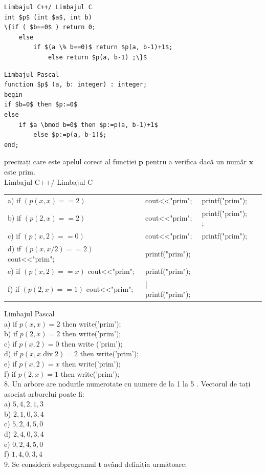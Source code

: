 \documentclass[10pt]{article}
\begin{document}
\begin{verbatim}
Limbajul C++/ Limbajul C
int $p$ (int $a$, int b)
\{if ( $b==0$ ) return 0;
    else
        if $(a \% b==0)$ return $p(a, b-1)+1$;
            else return $p(a, b-1) ;\}$
\end{verbatim}

\begin{verbatim}
Limbajul Pascal
function $p$ (a, b: integer) : integer;
begin
if $b=0$ then $p:=0$
else
    if $a \bmod b=0$ then $p:=p(a, b-1)+1$
        else $p:=p(a, b-1)$;
end;
\end{verbatim}

precizați care este apelul corect al funcției $\mathbf{p}$ pentru a verifica dacă un număr $\mathbf{x}$ este prim.\\
Limbajul C++/ Limbajul C

\begin{center}
\begin{tabular}{llll}
a) if $(p(x, x)==2)$ & cout<<"prim"; & printf("prim"); \\
b) if $(p(2, x)==2)$ & cout<<"prim"; & printf("prim"); ; \\
c) if $(p(x, 2)==0)$ & cout<<"prim"; & printf("prim"); \\
d) if $(p(x, x / 2)==2)$ cout<<"prim"; & printf("prim"); &  \\
e) if $(p(x, 2)==x)$ cout<<"prim"; & printf("prim"); &  \\
f) if $(p(2, x)==1)$ cout<<"prim"; & | printf("prim"); &  \\
\end{tabular}
\end{center}

Limbajul Pascal\\
a) if $p(x, x)=2$ then write('prim');\\
b) if $p(2, x)=2$ then write('prim');\\
c) if $p(x, 2)=0$ then write ('prim');\\
d) if $p(x, x \operatorname{div} 2)=2$ then write('prim');\\
e) if $p(x, 2)=x$ then write('prim');\\
f) if $p(2, x)=1$ then write('prim');\\
8. Un arbore are nodurile numerotate cu numere de la 1 la 5 . Vectorul de tați asociat arborelui poate fi:\\
a) $5,4,2,1,3$\\
b) $2,1,0,3,4$\\
c) $5,2,4,5,0$\\
d) $2,4,0,3,4$\\
e) $0,2,4,5,0$\\
f) $1,4,0,3,4$\\
9. Se consideră subprogramul $\mathbf{t}$ având definiția următoare:
\end{document}

